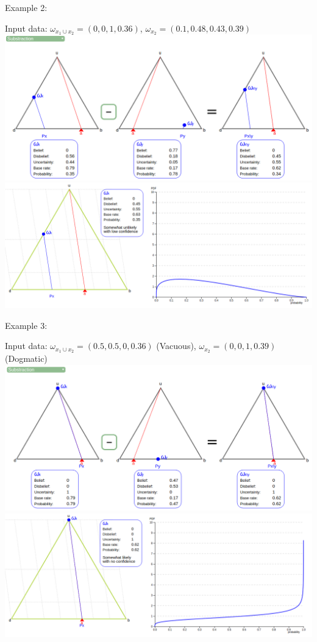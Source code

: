 \documentclass[UTF8]{article}
\newcommand{\opinion}[5]{$\omega_{#1} = (#2, #3, #4, #5)$}
\begin{document}
Example 2:
    \begin{center}
        Input data: 
        \opinion{x_1 \cup x_2}{0}{0}{1}{0.36}, 
        \opinion{x_2}{0.1}{0.48}{0.43}{0.39}\\
        \includegraphics[width=6in]{images/sub2.png}
        \includegraphics[width=6in]{images/sub2viz.png}
    \end{center}
Example 3:
    \begin{center}
        Input data: 
        \opinion{x_1 \cup x_2}{0.5}{0.5}{0}{0.36} (Vacuous), 
        \opinion{x_2}{0}{0}{1}{0.39} (Dogmatic)\\
        \includegraphics[width=6in]{images/sub3.png}
        \includegraphics[width=6in]{images/sub3viz.png}
    \end{center}
\end{document}

